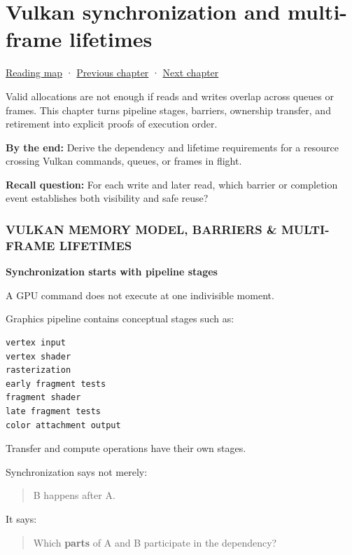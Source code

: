 \chapter{Vulkan synchronization and multi-frame lifetimes}\label{05-engine-i-ch022-vulkan-synchronization-and-multi-frame-lifetimes}\hypertarget{05-engine-i-ch022}{}\label{stagechapter:05-engine-i-ch022}

\hyperref[volume-reading-map]{Reading map} · \hyperref[05-engine-i-ch021-buffers-images-memory-and-uploads]{Previous chapter} · \hyperref[05-engine-i-ch023-execute-and-measure-a-metal-frame]{Next chapter}

Valid allocations are not enough if reads and writes overlap across queues or frames. This chapter turns pipeline stages, barriers, ownership transfer, and retirement into explicit proofs of execution order.

\textbf{By the end:} Derive the dependency and lifetime requirements for a resource crossing Vulkan commands, queues, or frames in flight.

\textbf{Recall question:} For each write and later read, which barrier or completion event establishes both visibility and safe reuse?

\subsection{VULKAN MEMORY MODEL, BARRIERS \& MULTI-FRAME LIFETIMES}\label{05-engine-i-ch022-vulkan-memory-model-barriers-multi-frame-lifetimes}

\textbf{Synchronization starts with pipeline stages}

A GPU command does not execute at one indivisible moment.

Graphics pipeline contains conceptual stages such as:

\begin{verbatim}
vertex input
vertex shader
rasterization
early fragment tests
fragment shader
late fragment tests
color attachment output
\end{verbatim}

Transfer and compute operations have their own stages.

Synchronization says not merely:

\begin{quote}
B happens after A.
\end{quote}

It says:

\begin{quote}
Which \textbf{parts} of A and B participate in the dependency?
\end{quote}

